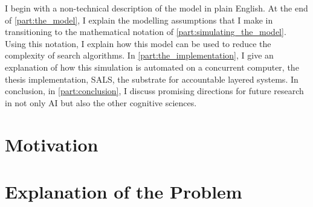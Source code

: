 I begin with a non-technical description of the model in plain
English.  At the end of \autoref{part:the_model}, I explain the
modelling assumptions that I make in transitioning to the mathematical
notation of \autoref{part:simulating_the_model}.  Using this notation,
I explain how this model can be used to reduce the complexity of
search algorithms.  In \autoref{part:the_implementation}, I give an
explanation of how this simulation is automated on a concurrent
computer, the thesis implementation, SALS, the substrate for
accountable layered systems.  In conclusion, in
\autoref{part:conclusion}, I discuss promising directions for future
research in not only AI but also the other cognitive sciences.

\section{Motivation}

\section{Explanation of the Problem}

%


